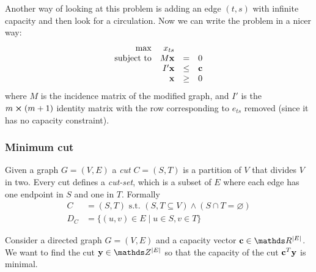 \documentclass[12pt]{extarticle}
\renewcommand{\vec}[1]{\bvec{#1}}
\begin{document}
Another way of looking at this problem is adding an edge $(t, s)$ with infinite capacity and then
look for a circulation. Now we can write the problem in a nicer way:
\begin{equation}
	\begin{array}{rrcl}
		\max              & x_{ts}    &      &        \\
		\text{subject to} & M \vec x  & =    & 0      \\
		                  & I' \vec x & \leq & \vec c \\
		                  & \vec x    & \geq & 0
	\end{array}
	\label{eq:st-flow-mod}
\end{equation}
where $M$ is the incidence matrix of the modified graph, and $I'$ is the $m\cross (m + 1)$ identity
matrix with the row corresponding to $e_{ts}$ removed (since it has no capacity constraint).

\subsubsection{Minimum cut}

Given a graph $G = (V, E)$ a \emph{cut} $C = (S, T)$ is a partition of $V$ that divides $V$ in two.
Every cut defines a \emph{cut-set}, which is a subset of $E$ where each edge has one endpoint in $S$
and one in $T$.
Formally
\begin{align}
	C   & = (S, T) \text{ s.t. } (S, T \subseteq V) \land (S \cap T = \varnothing) \\
	D_C & = \{ (u, v) \in E \mid u \in S, v \in T \}
\end{align}

Consider a directed graph $G = (V, E)$ and a capacity vector $\vec c \in \R^{\abs{E}}$.
We want to find the cut $\vec y \in \Z^\abs{E}$ so that the capacity of the cut $\vec c^T \vec y$ is
minimal.
\end{document}
